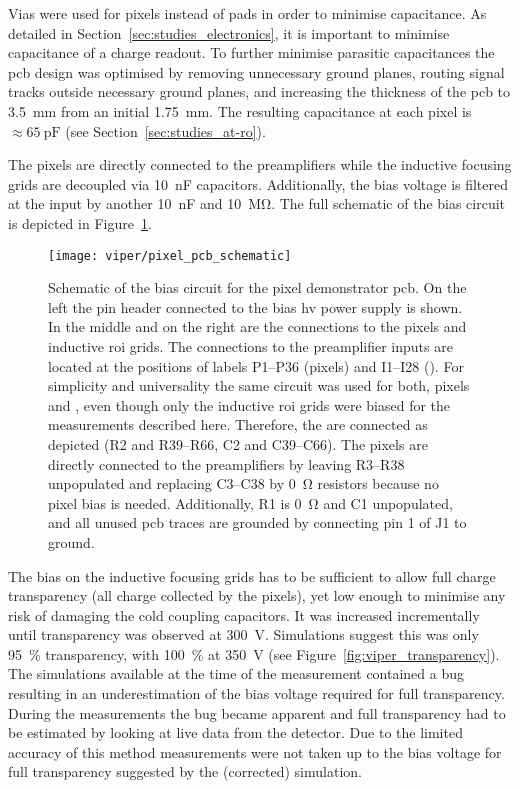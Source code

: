 Vias were used for pixels instead of pads in order to minimise capacitance.
As detailed in Section~\ref{sec:studies_electronics}, it is important to minimise capacitance of a charge readout.
To further minimise parasitic capacitances the \gls{pcb} design was optimised by removing unnecessary ground planes, routing signal tracks outside necessary ground planes, and increasing the thickness of the \gls{pcb} to \SI{3.5}{\milli\metre} from an initial \SI{1.75}{\milli\metre}. 
The resulting capacitance at each pixel is $\approx \SI{65}{\pico\farad}$ (see Section~\ref{sec:studies_at-ro}).

The pixels are directly connected to the preamplifiers while the inductive focusing grids are decoupled via \SI{10}{\nano\farad} capacitors.
Additionally, the bias voltage is filtered at the input by another \SI{10}{\nano\farad} and \SI{10}{\mega\ohm}.
The full schematic of the bias circuit is depicted in Figure~\ref{fig:viper_pcb_schematic}.

\begin{figure}[htb]
	\centering
	\texttt{[image: viper/pixel\_pcb\_schematic]}
	\caption[Pixel demonstrator bias circuit]{%
		Schematic of the bias circuit for the \AC{} pixel demonstrator \acrshort{pcb}.
		On the left the pin header connected to the bias \acrshort{hv} power supply is shown. In the middle and on the right are the connections to the pixels and inductive \acrshort{roi} grids.
		The connections to the preamplifier inputs are located at the positions of labels P1--P36 (pixels) and I1--I28 ().
		For simplicity and universality the same circuit was used for both, pixels and , even though only the inductive \acrshort{roi} grids were biased for the measurements described here.
		Therefore, the  are connected as depicted (R2 and R39--R66, C2 and C39--C66).
		The pixels are directly connected to the preamplifiers by leaving R3--R38 unpopulated and replacing C3--C38 by \SI{0}{\ohm} resistors because no pixel bias is needed.
		Additionally, R1 is \SI{0}{\ohm} and C1 unpopulated, and all unused \acrshort{pcb} traces are grounded by connecting pin 1 of J1 to ground.
	}
	\label{fig:viper_pcb_schematic}
\end{figure}

The bias on the inductive focusing grids has to be sufficient to allow full charge transparency (all charge collected by the pixels), yet low enough to minimise any risk of damaging the cold coupling capacitors.
It was increased incrementally until transparency was observed at \SI{300}{\volt}. 
Simulations suggest this was only \SI{95}{\percent} transparency, with \SI{100}{\percent} at \SI{350}{\volt} (see Figure~\ref{fig:viper_transparency}).
The simulations available at the time of the measurement contained a bug resulting in an underestimation of the bias voltage required for full transparency.
During the measurements the bug became apparent and full transparency had to be estimated by looking at live data from the detector.
Due to the limited accuracy of this method measurements were not taken up to the bias voltage for full transparency suggested by the (corrected) simulation.~\cite{francypants}

